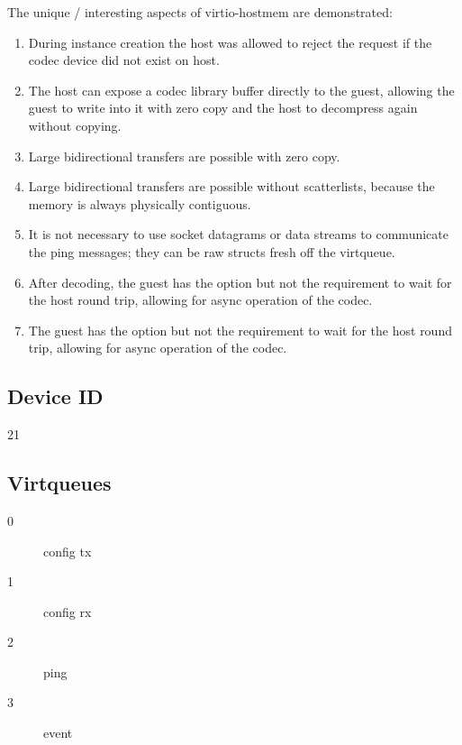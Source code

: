 The unique / interesting aspects of virtio-hostmem are demonstrated:

\begin{enumerate}

\item During instance creation the host was allowed to reject the request if
    the codec device did not exist on host.

\item The host can expose a codec library buffer directly to the guest, allowing the guest to write into it with zero copy and the host to decompress again without copying.

\item Large bidirectional transfers are possible with zero copy.

\item Large bidirectional transfers are possible without scatterlists, because
    the memory is always physically contiguous.

\item It is not necessary to use socket datagrams or data streams to
    communicate the ping messages; they can be raw structs fresh off the
        virtqueue.

\item After decoding, the guest has the option but not the requirement to wait
    for the host round trip, allowing for async operation of the codec.

\item The guest has the option but not the requirement to wait for the host
    round trip, allowing for async operation of the codec.

\end{enumerate}

\subsection{Device ID}\label{sec:Device Types / Host Memory Device / Device ID}

21

\subsection{Virtqueues}\label{sec:Device Types / Host Memory Device / Virtqueues}

\begin{description}
\item[0] config tx
\item[1] config rx
\item[2] ping
\item[3] event
\end{description}

